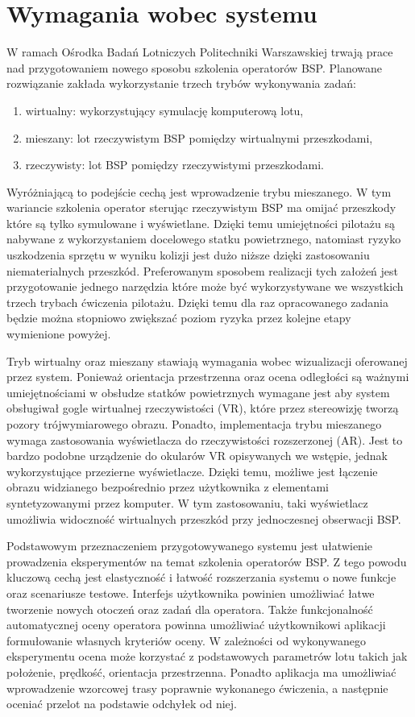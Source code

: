 \newpage
\section{Wymagania wobec systemu}
W ramach Ośrodka Badań Lotniczych Politechniki Warszawskiej trwają prace nad przygotowaniem nowego sposobu szkolenia operatorów BSP. Planowane rozwiązanie zakłada wykorzystanie trzech trybów wykonywania zadań:
\begin{enumerate}
  \item wirtualny: wykorzystujący symulację komputerową lotu,
  \item mieszany: lot rzeczywistym BSP pomiędzy wirtualnymi przeszkodami,
  \item rzeczywisty: lot BSP pomiędzy rzeczywistymi przeszkodami.
\end{enumerate}
Wyróżniającą to podejście cechą jest wprowadzenie trybu mieszanego. W tym wariancie szkolenia operator sterując rzeczywistym BSP ma omijać przeszkody które są tylko symulowane i wyświetlane. Dzięki temu umiejętności pilotażu są nabywane z wykorzystaniem docelowego statku powietrznego, natomiast ryzyko uszkodzenia sprzętu w wyniku kolizji jest dużo niższe dzięki zastosowaniu niematerialnych przeszkód. Preferowanym sposobem realizacji tych założeń jest przygotowanie jednego narzędzia które może być wykorzystywane we wszystkich trzech trybach ćwiczenia pilotażu. Dzięki temu dla raz opracowanego zadania będzie można stopniowo zwiększać poziom ryzyka przez kolejne etapy wymienione powyżej.

Tryb wirtualny oraz mieszany stawiają wymagania wobec wizualizacji oferowanej przez system. Ponieważ orientacja przestrzenna oraz ocena odległości są ważnymi umiejętnościami w obsłudze statków powietrznych wymagane jest aby system obsługiwał gogle wirtualnej rzeczywistości (VR), które przez stereowizję tworzą pozory trójwymiarowego obrazu. Ponadto, implementacja trybu mieszanego wymaga zastosowania wyświetlacza do rzeczywistości rozszerzonej (AR). Jest to bardzo podobne urządzenie do okularów VR opisywanych we wstępie, jednak wykorzystujące przezierne wyświetlacze. Dzięki temu, możliwe jest łączenie obrazu widzianego bezpośrednio przez użytkownika z elementami syntetyzowanymi przez komputer. W tym zastosowaniu, taki wyświetlacz umożliwia widoczność wirtualnych przeszkód przy jednoczesnej obserwacji BSP.

Podstawowym przeznaczeniem przygotowywanego systemu jest ułatwienie prowadzenia eksperymentów na temat szkolenia operatorów BSP. Z tego powodu kluczową cechą jest elastyczność i łatwość rozszerzania systemu o nowe funkcje oraz scenariusze testowe. Interfejs użytkownika powinien umożliwiać łatwe tworzenie nowych otoczeń oraz zadań dla operatora. Także funkcjonalność automatycznej oceny operatora powinna umożliwiać użytkownikowi aplikacji formułowanie własnych kryteriów oceny. W zależności od wykonywanego eksperymentu ocena może korzystać z podstawowych parametrów lotu takich jak położenie, prędkość, orientacja przestrzenna. Ponadto aplikacja ma umożliwiać wprowadzenie wzorcowej trasy poprawnie wykonanego ćwiczenia, a następnie oceniać przelot na podstawie odchyłek od niej.

